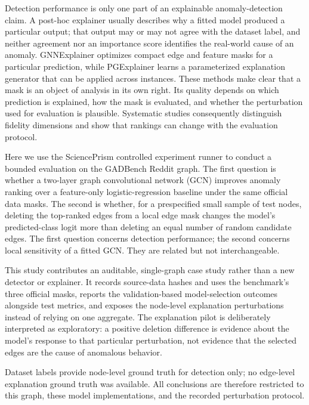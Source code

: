 \documentclass[11pt,a4paper]{article}
\begin{document}
Detection performance is only one part of an explainable anomaly-detection claim. A post-hoc explainer usually describes why a fitted model produced a particular output; that output may or may not agree with the dataset label, and neither agreement nor an importance score identifies the real-world cause of an anomaly. GNNExplainer optimizes compact edge and feature masks for a particular prediction\cite{ying2019gnnexplainer}, while PGExplainer learns a parameterized explanation generator that can be applied across instances\cite{luo2020pgexplainer}. These methods make clear that a mask is an object of analysis in its own right. Its quality depends on which prediction is explained, how the mask is evaluated, and whether the perturbation used for evaluation is plausible. Systematic studies consequently distinguish fidelity dimensions and show that rankings can change with the evaluation protocol\cite{amara2022graphframex,agarwal2022probing,zheng2024robust}.

Here we use the SciencePrism controlled experiment runner to conduct a bounded evaluation on the GADBench Reddit graph. The first question is whether a two-layer graph convolutional network (GCN) improves anomaly ranking over a feature-only logistic-regression baseline under the same official data masks. The second is whether, for a prespecified small sample of test nodes, deleting the top-ranked edges from a local edge mask changes the model's predicted-class logit more than deleting an equal number of random candidate edges. The first question concerns detection performance; the second concerns local sensitivity of a fitted GCN. They are related but not interchangeable.

This study contributes an auditable, single-graph case study rather than a new detector or explainer. It records source-data hashes and uses the benchmark's three official masks, reports the validation-based model-selection outcomes alongside test metrics, and exposes the node-level explanation perturbations instead of relying on one aggregate. The explanation pilot is deliberately interpreted as exploratory: a positive deletion difference is evidence about the model's response to that particular perturbation, not evidence that the selected edges are the cause of anomalous behavior.

Dataset labels provide node-level ground truth for detection only; no edge-level explanation ground truth was available. All conclusions are therefore restricted to this graph, these model implementations, and the recorded perturbation protocol.
\end{document}
